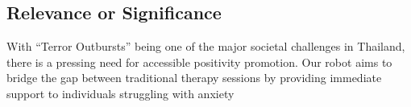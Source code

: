 \subsection{Relevance or Significance}
With “Terror Outbursts” being one of the major societal challenges in Thailand, there is a pressing need
for accessible positivity promotion. Our robot aims to bridge the gap between traditional therapy sessions
by providing immediate support to individuals struggling with anxiety
